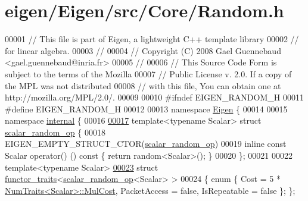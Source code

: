 \hypertarget{eigen_2_eigen_2src_2_core_2_random_8h_source}{}\section{eigen/\+Eigen/src/\+Core/\+Random.h}
\label{eigen_2_eigen_2src_2_core_2_random_8h_source}

\begin{DoxyCode}
00001 \textcolor{comment}{// This file is part of Eigen, a lightweight C++ template library}
00002 \textcolor{comment}{// for linear algebra.}
00003 \textcolor{comment}{//}
00004 \textcolor{comment}{// Copyright (C) 2008 Gael Guennebaud <gael.guennebaud@inria.fr>}
00005 \textcolor{comment}{//}
00006 \textcolor{comment}{// This Source Code Form is subject to the terms of the Mozilla}
00007 \textcolor{comment}{// Public License v. 2.0. If a copy of the MPL was not distributed}
00008 \textcolor{comment}{// with this file, You can obtain one at http://mozilla.org/MPL/2.0/.}
00009 
00010 \textcolor{preprocessor}{#ifndef EIGEN\_RANDOM\_H}
00011 \textcolor{preprocessor}{#define EIGEN\_RANDOM\_H}
00012 
00013 \textcolor{keyword}{namespace }\hyperlink{namespace_eigen}{Eigen} \{ 
00014 
00015 \textcolor{keyword}{namespace }\hyperlink{namespaceinternal}{internal} \{
00016 
\hyperlink{struct_eigen_1_1internal_1_1scalar__random__op}{00017} \textcolor{keyword}{template}<\textcolor{keyword}{typename} Scalar> \textcolor{keyword}{struct }\hyperlink{struct_eigen_1_1internal_1_1scalar__random__op}{scalar\_random\_op} \{
00018   EIGEN\_EMPTY\_STRUCT\_CTOR(\hyperlink{struct_eigen_1_1internal_1_1scalar__random__op}{scalar\_random\_op})
00019   \textcolor{keyword}{inline} \textcolor{keyword}{const} Scalar operator() ()\textcolor{keyword}{ const }\{ \textcolor{keywordflow}{return} random<Scalar>(); \}
00020 \};
00021 
00022 \textcolor{keyword}{template}<\textcolor{keyword}{typename} Scalar>
\hyperlink{struct_eigen_1_1internal_1_1functor__traits_3_01scalar__random__op_3_01_scalar_01_4_01_4}{00023} \textcolor{keyword}{struct }\hyperlink{struct_eigen_1_1internal_1_1functor__traits}{functor\_traits}<\hyperlink{struct_eigen_1_1internal_1_1scalar__random__op}{scalar\_random\_op}<Scalar> >
00024 \{ \textcolor{keyword}{enum} \{ Cost = 5 * \hyperlink{group___core___module_struct_eigen_1_1_num_traits}{NumTraits<Scalar>::MulCost}, PacketAccess = \textcolor{keyword}{false}, 
      IsRepeatable = \textcolor{keyword}{false} \}; \};

\end{DoxyCode}
